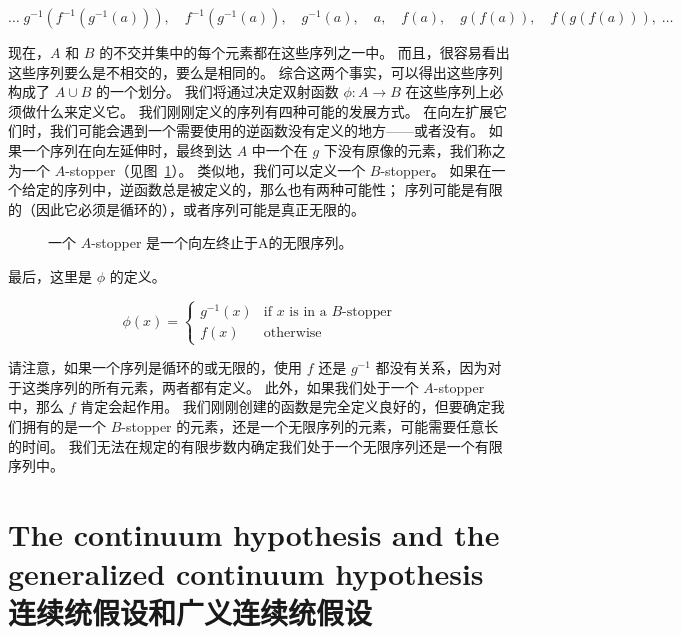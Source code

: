 \[
    \ldots \; g^{-1}(f^{-1}(g^{-1}(a))), \quad f^{-1}(g^{-1}(a)), \quad g^{-1}(a), \quad a, \quad  f(a), \quad  g(f(a)), \quad f(g(f(a))),\;
    \ldots \]

现在，$A$ 和 $B$ 的不交并集中的每个元素都在这些序列之一中。
而且，很容易看出这些序列要么是不相交的，要么是相同的。
综合这两个事实，可以得出这些序列构成了 $A \cup B$ 的一个划分。
我们将通过决定双射函数 $\phi : A \longrightarrow B$ 在这些序列上必须做什么来定义它。
我们刚刚定义的序列有四种可能的发展方式。
在向左扩展它们时，我们可能会遇到一个需要使用的逆函数没有定义的地方——或者没有。
如果一个序列在向左延伸时，最终到达 $A$ 中一个在 $g$ 下没有原像的元素，我们称之为一个 $A$-stopper（见图~\ref{fig:A-stopper}）。
类似地，我们可以定义一个 $B$-stopper。
如果在一个给定的序列中，逆函数总是被定义的，那么也有两种可能性；
序列可能是有限的（因此它必须是循环的），或者序列可能是真正无限的。

\begin{figure}[!hbtp]
    \begin{center}
        
    \end{center}
    \caption[C-B-S证明中的一个\emph{A}-stopper。]{一个 $A$-stopper 是一个向左终止于A的无限序列。}
    \label{fig:A-stopper}
\end{figure}

最后，这里是 $\phi$ 的定义。

\[ \phi(x) =  \left\{ \begin{array}{cl} g^{-1}(x) & \mbox{if $x$ is in a $B$-stopper} \\ f(x) & \mbox{otherwise} \end{array} \right.
\]

请注意，如果一个序列是循环的或无限的，使用 $f$ 还是 $g^{-1}$ 都没有关系，因为对于这类序列的所有元素，两者都有定义。
此外，如果我们处于一个 $A$-stopper 中，那么 $f$ 肯定会起作用。
我们刚刚创建的函数是完全定义良好的，但要确定我们拥有的是一个 $B$-stopper 的元素，还是一个无限序列的元素，可能需要任意长的时间。
我们无法在规定的有限步数内确定我们处于一个无限序列还是一个有限序列中。

\clearpage




\newpage

\section[CH and GCH]{The continuum hypothesis and the generalized continuum hypothesis 连续统假设和广义连续统假设}
\label{sec:ch_gch}

